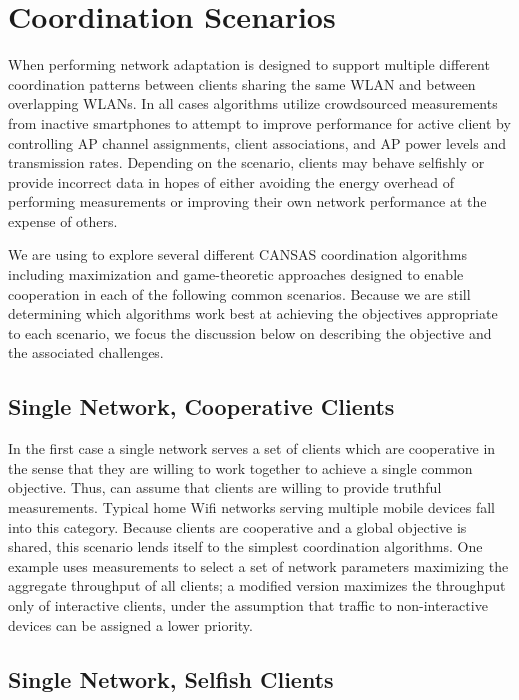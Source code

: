 \section{Coordination Scenarios}
\label{sec-algorithms}

When performing network adaptation \PS{} is designed to support multiple
different coordination patterns between clients sharing the same WLAN and
between overlapping WLANs. In all cases \PS{} algorithms utilize crowdsourced
measurements from inactive smartphones to attempt to improve performance for
active client by controlling AP channel assignments, client associations, and
AP power levels and transmission rates. Depending on the scenario, clients
may behave selfishly or provide incorrect data in hopes of either avoiding
the energy overhead of performing measurements or improving their own network
performance at the expense of others.

We are using \PS{} to explore several different CANSAS coordination
algorithms including maximization and game-theoretic approaches designed to
enable cooperation in each of the following common scenarios. Because we are
still determining which algorithms work best at achieving the objectives
appropriate to each scenario, we focus the discussion below on describing the
objective and the associated challenges.

\subsection{Single Network, Cooperative Clients}

In the first case a single network serves a set of clients which are
cooperative in the sense that they are willing to work together to achieve a
single common objective. Thus, \PS{} can assume that clients are willing to
provide truthful measurements. Typical home Wifi networks serving multiple
mobile devices fall into this category. Because clients are cooperative and a
global objective is shared, this scenario lends itself to the simplest
coordination algorithms. One example uses \PS{} measurements to select a set
of network parameters maximizing the aggregate throughput of all clients; a
modified version maximizes the throughput only of interactive clients, under
the assumption that traffic to non-interactive devices can be assigned a
lower priority.

\subsection{Single Network, Selfish Clients}

